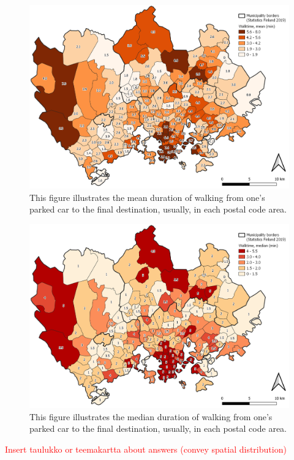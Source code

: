 \begin{figure}[H]%
    \centering
    \includegraphics[width=.88\textwidth]{images/thesis_postalvis_walkmean.png}
    \caption[Walktime, mean, in the research area]{This figure illustrates the mean duration of walking from one's parked car to the final destination, usually, in each postal code area.}%
    \label{fig:postalvis_walkmean}%
\end{figure}

\begin{figure}[H]%
    \centering
    \includegraphics[width=.88\textwidth]{images/thesis_postalvis_walkmedian.png}
    \caption[Walktime, median, in the research area]{This figure illustrates the median duration of walking from one's parked car to the final destination, usually, in each postal code area.}%
    \label{fig:postalvis_walkmedian}%
\end{figure}

\textcolor{red}{Insert taulukko or teemakartta about answers (convey spatial distribution)}

